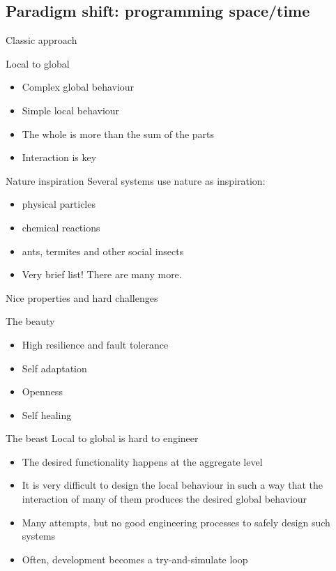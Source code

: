 \documentclass[presentation]{beamer}\mode<presentation>{\usetheme{sapere}}
\begin{document}
\subsection{Paradigm shift: programming space/time}
\begin{frame}{Classic approach}
\begin{block}{Local to global}
  \begin{itemize}
    \item Complex global behaviour
    \item Simple local behaviour
    \item The whole is more than the sum of the parts
    \item Interaction is key
  \end{itemize}
\end{block}
\begin{block}{Nature inspiration}
   Several systems use nature as inspiration:
  \begin{itemize}
    \item physical particles \cite{mamei2009acm}
    \item chemical reactions \cite{sapere-procedia7}
    \item ants, termites and other social insects \cite{swarmlinda}
    \item Very brief list! There are many more.
  \end{itemize}
\end{block}
\end{frame}

\begin{frame}{Nice properties and hard challenges}
  \begin{block}{The beauty}
    \begin{itemize}
      \item High resilience and fault tolerance
      \item Self adaptation
      \item Openness
      \item Self healing
    \end{itemize}
  \end{block}
  \begin{block}{The beast}
    Local to global is hard to engineer
    \begin{itemize}
      \item The desired functionality happens at the aggregate level
      \item It is very difficult to design the local behaviour in such a way that the interaction of many of them produces the desired global behaviour
      \item Many attempts, but no good engineering processes to safely design such systems
      \item Often, development becomes a try-and-simulate loop
    \end{itemize}
  \end{block}
\end{frame}
\end{document}
